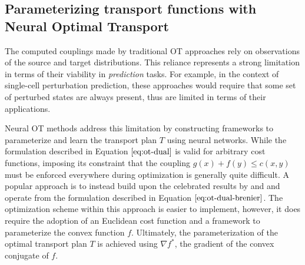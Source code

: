 \subsection{Parameterizing transport functions with Neural Optimal Transport}
The computed couplings made by traditional OT approaches rely on observations of the source and target distributions.
This reliance represents a strong limitation in terms of their viability in \emph{prediction} tasks.
For example, in the context of single-cell perturbation prediction,
these approaches would require that some set of perturbed states are always present,
thus are limited in terms of their applications.

Neural OT methods address this limitation by constructing frameworks to parameterize and learn the transport plan $T$ using neural networks.
While the formulation described in Equation $\ref{eq:ot-dual}$ is valid for arbitrary cost functions,
imposing its constraint that the coupling $g(x) + f(y) \leq c(x, y)$ must be enforced everywhere during optimization is generally quite difficult.
A popular approach is to instead build upon the celebrated results by \citet{knott1984} and \citet{brenier1991}
and operate from the formulation described in Equation $\ref{eq:ot-dual-brenier}$.
The optimization scheme within this approach is easier to implement, however, it does require
the adoption of an Euclidean cost function and a framework to parameterize the convex function $f$.
Ultimately, the parameterization of the optimal transport plan $T$ is achieved using $\nabla f^*$,  the gradient of the convex conjugate of $f$.

